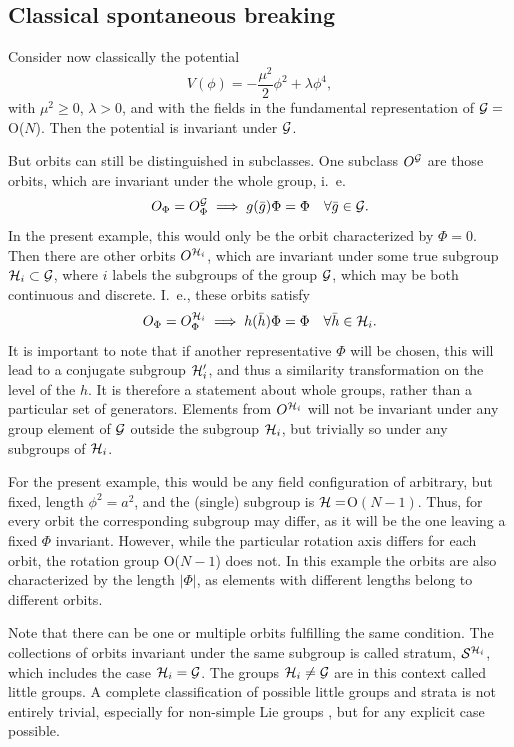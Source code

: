\documentclass[final,12pt]{article}
\newcommand*{\no}{\noindent}
\newcommand*{\be}{\begin{equation}}
\newcommand*{\ee}{\end{equation}}
\newcommand*{\nn}{\nonumber}
\newcommand*{\1}{1\!\!\!\bot}
\begin{document}
\subsection{Classical spontaneous breaking}\label{ss:cssb}

Consider now classically the potential
\be
V(\phi)=-\frac{\mu^2}{2}\phi^2+\lambda\phi^4\label{esb:pot},
\ee
\no with $\mu^2\ge0$, $\lambda>0$, and with the fields in the fundamental representation of ${\cal G}=$O($N$). Then the potential is invariant under ${\cal G}$.

But orbits can still be distinguished in subclasses. One subclass $O^{\cal G}$ are those orbits, which are invariant under the whole group, i.\ e.\
\be
O_\Phi=O_\Phi^{\cal G}\implies g(\bar{g})\Phi=\Phi\quad\forall \bar{g}\in{\cal G}\nn.
\ee
\no In the present example, this would only be the orbit characterized by $\Phi=0$. Then there are other orbits $O^{{\cal H}_i}$, which are invariant under some true subgroup ${\cal H}_i\subset{\cal G}$, where $i$ labels the subgroups of the group ${\cal G}$, which may be both continuous and discrete. I.\ e., these orbits satisfy
\be
O_\Phi=O_\Phi^{{\cal H}_i}\implies h(\bar{h})\Phi=\Phi\quad\forall \bar{h}\in{\cal H}_i\nn.
\ee
\no  It is important to note that if another representative $\Phi$ will be chosen, this will lead to a conjugate subgroup ${\cal H}_i'$, and thus a similarity transformation on the level of the $h$. It is therefore a statement about whole groups, rather than a particular set of generators. Elements from $O^{{\cal H}_i}$ will not be invariant under any group element of ${\cal G}$ outside the subgroup ${\cal H}_i$, but trivially so under any subgroups of ${\cal H}_i$.

For the present example, this would be any field configuration of arbitrary, but fixed, length $\phi^2=a^2$, and the (single) subgroup is ${\cal H}=$O$(N-1)$. Thus, for every orbit the corresponding subgroup may differ, as it will be the one leaving a fixed $\Phi$ invariant. However, while the particular rotation axis differs for each orbit, the rotation group O($N-1$) does not. In this example the orbits are also characterized by the length $|\Phi|$, as elements with different lengths belong to different orbits.

Note that there can be one or multiple orbits fulfilling the same condition. The collections of orbits invariant under the same subgroup is called stratum, ${\cal S}^{{\cal H}_i}$, which includes the case ${\cal H}_i={\cal G}$. The groups ${\cal H}_i\neq{\cal G}$ are in this context called little groups. A complete classification of possible little groups and strata is not entirely trivial, especially for non-simple Lie groups \cite{O'Raifeartaigh:1978kv}, but for any explicit case possible.
\end{document}
